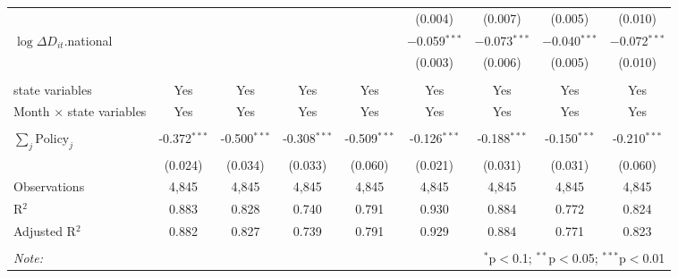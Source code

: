\begin{tabular}{@{\extracolsep{1pt}}lcccccccc}
  &  &  &  &  & (0.004) & (0.007) & (0.005) & (0.010) \\ 
  $\log \Delta D_{it}$.national &  &  &  &  & $-$0.059$^{***}$ & $-$0.073$^{***}$ & $-$0.040$^{***}$ & $-$0.072$^{***}$ \\ 
  &  &  &  &  & (0.003) & (0.006) & (0.005) & (0.010) \\ 
 \hline \\[-1.8ex] 
state variables & Yes & Yes & Yes & Yes & Yes & Yes & Yes & Yes \\ 
Month $\times$ state variables & Yes & Yes & Yes & Yes & Yes & Yes & Yes & Yes \\ 
\hline \\[-1.8ex] 
$\sum_j \mathrm{Policy}_j$ & -0.372$^{***}$ & -0.500$^{***}$ & -0.308$^{***}$ & -0.509$^{***}$ & -0.126$^{***}$ & -0.188$^{***}$ & -0.150$^{***}$ & -0.210$^{***}$ \\ 
 & (0.024) & (0.034) & (0.033) & (0.060) & (0.021) & (0.031) & (0.031) & (0.060) \\ 
Observations & 4,845 & 4,845 & 4,845 & 4,845 & 4,845 & 4,845 & 4,845 & 4,845 \\ 
R$^{2}$ & 0.883 & 0.828 & 0.740 & 0.791 & 0.930 & 0.884 & 0.772 & 0.824 \\ 
Adjusted R$^{2}$ & 0.882 & 0.827 & 0.739 & 0.791 & 0.929 & 0.884 & 0.771 & 0.823 \\ 
\hline 
\hline \\[-1.8ex] 
\textit{Note:}  & \multicolumn{8}{r}{$^{*}$p$<$0.1; $^{**}$p$<$0.05; $^{***}$p$<$0.01} \\ 
\end{tabular} 